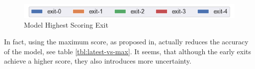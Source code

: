 \begin{figure}
	\captionsetup[subfigure]{justification=centering}
	\centering
	\includegraphics[width=.7\linewidth]{figures/edge/exit0-4_legend}
	\hfill
	\hfill
	\caption[Model Highest Scoring Exit]{Model Highest Scoring Exit}
	\label{fig:exit-highscore}
\end{figure}

In fact, using the maximum score, as proposed in\cite{kaya_shallow-deep_nodate}, actually reduces the accuracy of the model, see table \ref{tbl:latest-vs-max}. It seems, that although the early exits achieve a higher score, they also introduces more uncertainty.  

